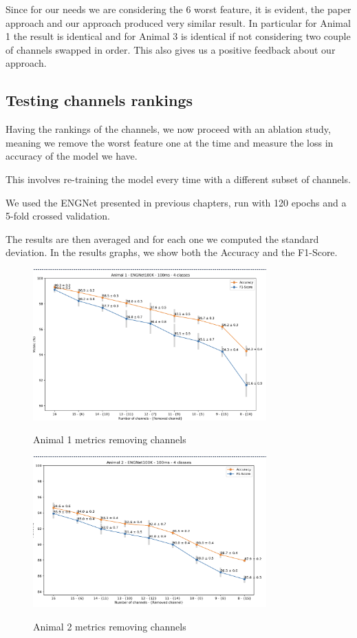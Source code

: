 \documentclass{Configuration_Files/PoliMi3i_thesis}
\begin{document}
Since for our needs we are considering the 6 worst feature, it is evident, the paper approach and our approach produced very similar result.
In particular for Animal 1 the result is identical and for Animal 3 is identical if not considering two couple of channels swapped in order.
This also gives us a positive feedback about our approach.

\subsection{Testing channels rankings}

Having the rankings of the channels, we now proceed with an ablation study, meaning we remove the worst feature one at the time and measure the loss in accuracy of the model we have.

This involves re-training the model every time with a different subset of channels.

We used the ENGNet presented in previous chapters, run with 120 epochs and a 5-fold crossed validation.

The results are then averaged and for each one we computed the standard deviation.
In the results graphs, we show both the Accuracy and the F1-Score.


\begin{figure}[H]
    \centering
    \includegraphics[width=0.8\textwidth]{Results Matteo/figure2}
    \label{figure2}
    \caption{Animal 1 metrics removing channels}
\end{figure}

\begin{figure}[H]
    \centering
    \includegraphics[width=0.8\textwidth]{Results Matteo/figure3}
    \label{figure3}
    \caption{Animal 2 metrics removing channels}
\end{figure}
\end{document}
